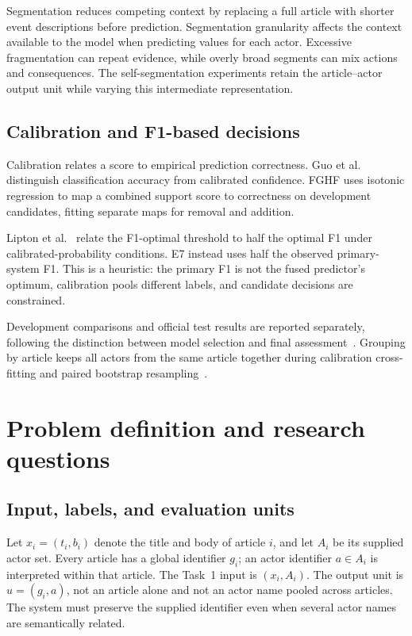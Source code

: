 \documentclass[12pt,a4paper]{article}
\begin{document}
Segmentation reduces competing context by replacing a full article with shorter event descriptions before prediction. Segmentation granularity affects the context available to the model when predicting values for each actor. Excessive fragmentation can repeat evidence, while overly broad segments can mix actions and consequences. The self-segmentation experiments retain the article--actor output unit while varying this intermediate representation.

\subsection{Calibration and F1-based decisions}
Calibration relates a score to empirical prediction correctness. Guo et al.~\cite{guo2017} distinguish classification accuracy from calibrated confidence. FGHF uses isotonic regression to map a combined support score to correctness on development candidates, fitting separate maps for removal and addition.

Lipton et al.~\cite{lipton2014} relate the F1-optimal threshold to half the optimal F1 under calibrated-probability conditions. E7 instead uses half the observed primary-system F1. This is a heuristic: the primary F1 is not the fused predictor's optimum, calibration pools different labels, and candidate decisions are constrained.

Development comparisons and official test results are reported separately, following the distinction between model selection and final assessment~\cite{cawley2010}. Grouping by article keeps all actors from the same article together during calibration cross-fitting and paired bootstrap resampling~\cite{dror2018}.


\sectionbreak
\section{Problem definition and research questions}\label{sec:problem}
\subsection{Input, labels, and evaluation units}
Let $x_i=(t_i,b_i)$ denote the title and body of article $i$, and let $A_i$ be its supplied actor set. Every article has a global identifier $g_i$; an actor identifier $a\in A_i$ is interpreted within that article. The Task~1 input is $(x_i,A_i)$. The output unit is $u=(g_i,a)$, not an article alone and not an actor name pooled across articles. The system must preserve the supplied identifier even when several actor names are semantically related.
\end{document}
